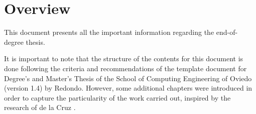 \renewcommand{\documentname}{Overview}

\chapter{Overview}

This document presents all the important information regarding the \textit{\tfg} end-of-degree thesis.

It is important to note that the structure of the contents for this document is done following the criteria and recommendations of the template document for Degree's and Master's Thesis of the School of Computing Engineering of Oviedo (version 1.4) \cite{doc-template} by Redondo. However, some additional chapters were introduced in order to capture the particularity of the work carried out, inspired by the research of de la Cruz \cite{metaheuristics-groups}.

